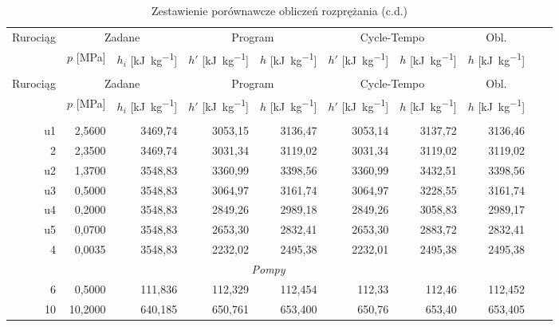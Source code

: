\begin{longtable}{|*{10}{r|}}
	\caption{Zestawienie porównawcze obliczeń rozprężania}
	\label{test-wyniki2} \\

	\hline
		\multirow{2}{*}{Rurociąg} &
		\multicolumn{2}{c|}{Zadane} &
		\multicolumn{2}{c|}{Program} &
		\multicolumn{2}{c|}{Cycle-Tempo} &
		\multicolumn{1}{c|}{Obl.} \\
	\cline{2-8}
		&
		\multicolumn{1}{c|}{$p$ [\si{\mega\pascal}]} &
		\multicolumn{1}{c|}{$h_i$ [\si{\kilo\joule\per\kilogram}]} &
		\multicolumn{1}{c|}{$h'$ [\si{\kilo\joule\per\kilogram}]} &
		\multicolumn{1}{c|}{$h$ [\si{\kilo\joule\per\kilogram}]} &
		\multicolumn{1}{c|}{$h'$ [\si{\kilo\joule\per\kilogram}]} &
		\multicolumn{1}{c|}{$h$ [\si{\kilo\joule\per\kilogram}]} &
		\multicolumn{1}{c|}{$h$ [\si{\kilo\joule\per\kilogram}]} \\
	\hline
	\endfirsthead
	\caption{Zestawienie porównawcze obliczeń rozprężania (c.d.)} \\

	\hline
		\multirow{2}{*}{Rurociąg} &
		\multicolumn{2}{c|}{Zadane} &
		\multicolumn{2}{c|}{Program} &
		\multicolumn{2}{c|}{Cycle-Tempo} &
		\multicolumn{1}{c|}{Obl.} \\
	\cline{2-8}
		&
		\multicolumn{1}{c|}{$p$ [\si{\mega\pascal}]} &
		\multicolumn{1}{c|}{$h_i$ [\si{\kilo\joule\per\kilogram}]} &
		\multicolumn{1}{c|}{$h'$ [\si{\kilo\joule\per\kilogram}]} &
		\multicolumn{1}{c|}{$h$ [\si{\kilo\joule\per\kilogram}]} &
		\multicolumn{1}{c|}{$h'$ [\si{\kilo\joule\per\kilogram}]} &
		\multicolumn{1}{c|}{$h$ [\si{\kilo\joule\per\kilogram}]} &
		\multicolumn{1}{c|}{$h$ [\si{\kilo\joule\per\kilogram}]} \\
	\hline
	\endhead
	\hline
	\endfoot
		\multicolumn{8}{|c|}{\textit{Turbiny}} \\
	\hline
		u1 &  2,5600 & 3469,74 & 3053,15 & 3136,47 & 3053,14 & 3137,72 & 3136,46 \\
		 2 &  2,3500 & 3469,74 & 3031,34 & 3119,02 & 3031,34 & 3119,02 & 3119,02 \\
		u2 &  1,3700 & 3548,83 & 3360,99 & 3398,56 & 3360,99 & 3432,51 & 3398,56 \\
		u3 &  0,5000 & 3548,83 & 3064,97 & 3161,74 & 3064,97 & 3228,55 & 3161,74 \\
		u4 &  0,2000 & 3548,83 & 2849,26 & 2989,18 & 2849,26 & 3058,83 & 2989,17 \\
		u5 &  0,0700 & 3548,83 & 2653,30 & 2832,41 & 2653,30 & 2883,72 & 2832,41 \\
		 4 &  0,0035 & 3548,83 & 2232,02 & 2495,38 & 2232,01 & 2495,38 & 2495,38 \\
	\hline
		\multicolumn{8}{|c|}{\textit{Pompy}} \\
	\hline
		 6 &  0,5000 & 111,836 & 112,329 & 112,454 & 112,33 & 112,46 & 112,452 \\
		10 & 10,2000 & 640,185 & 650,761 & 653,400 & 650,76 & 653,40 & 653,405 \\
\end{longtable}

